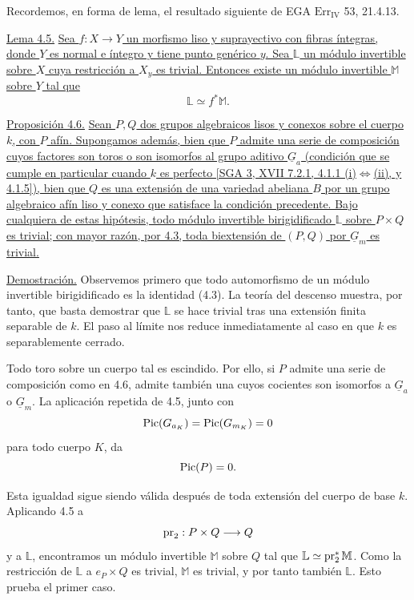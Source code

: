 
Recordemos, en forma de lema, el resultado siguiente de EGA
$\mathrm{Err}_{\mathrm{IV}}$ 53, 21.4.13.

\medskip
\noindent\underline{Lema 4.5.} \underline{Sea
$f:X\longrightarrow Y$ un morfismo liso y suprayectivo con fibras
íntegras, donde $Y$ es normal e íntegro y tiene punto genérico $y$.
Sea $\mathbb L$ un módulo invertible sobre $X$ cuya restricción a
$X_y$ es trivial. Entonces existe un módulo invertible $\mathbb M$
sobre $Y$ tal que}
\[
 \mathbb L\simeq f^*\mathbb M.
\]

\medskip
\noindent\underline{Proposición 4.6.} \underline{Sean $P,Q$ dos
grupos algebraicos lisos y conexos sobre el cuerpo $k$, con $P$ afín.
Supongamos además, bien que $P$ admite una serie de composición cuyos
factores son toros o son isomorfos al grupo aditivo $\underline G_a$
(condición que se cumple en particular cuando $k$ es perfecto [SGA 3,
XVII 7.2.1, 4.1.1 (i)$\Longleftrightarrow$(ii), y 4.1.5]), bien que
$Q$ es una extensión de una variedad abeliana $B$ por un grupo
algebraico afín liso y conexo que satisface la condición precedente.
Bajo cualquiera de estas hipótesis, todo módulo invertible
birigidificado $\mathbb L$ sobre $P\times Q$ es trivial; con mayor
razón, por 4.3, toda biextensión de $(P,Q)$ por $\underline G_m$ es
trivial.}

\noindent\underline{Demostración.} Observemos primero que todo
automorfismo de un módulo invertible birigidificado es la identidad
(4.3). La teoría del descenso muestra, por tanto, que basta demostrar
que $\mathbb L$ se hace trivial tras una extensión finita separable de
$k$. El paso al límite nos reduce inmediatamente al caso en que $k$
es separablemente cerrado.

Todo toro sobre un cuerpo tal es escindido. Por ello, si $P$ admite
una serie de composición como en 4.6, admite también una cuyos
cocientes son isomorfos a $\underline G_a$ o $\underline G_m$. La
aplicación repetida de 4.5, junto con
\[
 \operatorname{Pic}(G_{a_K})=\operatorname{Pic}(G_{m_K})=0
\]
para todo cuerpo $K$, da
\[
 \operatorname{Pic}(P)=0.
\]


Esta igualdad sigue siendo válida después de toda extensión del cuerpo
de base $k$. Aplicando 4.5 a
\[
 \operatorname{pr}_2:P\times Q\longrightarrow Q
\]
y a $\mathbb L$, encontramos un módulo invertible $\mathbb M$ sobre
$Q$ tal que $\mathbb L\simeq\operatorname{pr}_2^*\mathbb M$. Como la restricción de
$\mathbb L$ a $e_P\times Q$ es trivial, $\mathbb M$ es trivial, y por
tanto también $\mathbb L$. Esto prueba el primer caso.

